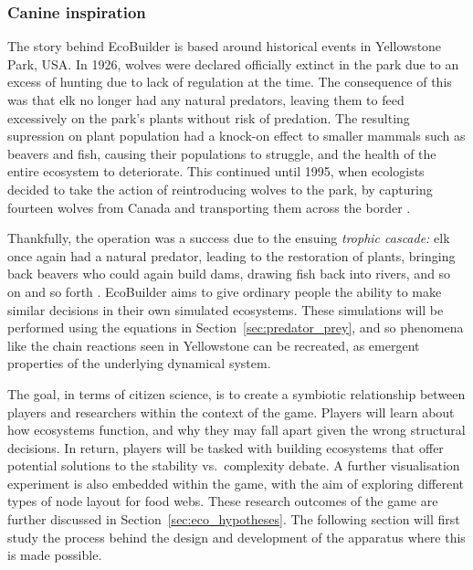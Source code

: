 \subsubsection{Canine inspiration}
\label{sec:yellowstone}
The story behind EcoBuilder is based around historical events in Yellowstone Park, USA. In 1926, wolves were declared officially extinct in the park due to an excess of hunting due to lack of regulation at the time. 
The consequence of this was that elk no longer had any natural predators, leaving them to feed excessively on the park's plants without risk of predation. The resulting supression on plant population had a knock-on effect to smaller mammals such as beavers and fish, causing their populations to struggle, and the health of the entire ecosystem to deteriorate.
This continued until 1995, when ecologists decided to take the action of reintroducing wolves to the park, by capturing fourteen wolves from Canada and transporting them across the border \citep{Smith2003}.

Thankfully, the operation was a success due to the ensuing \emph{trophic cascade:} elk once again had a natural predator, leading to the restoration of plants, bringing back beavers who could again build dams, drawing fish back into rivers, and so on and so forth \citep{Dobson2014}.
EcoBuilder aims to give ordinary people the ability to make similar decisions in their own simulated ecosystems. These simulations will be performed using the equations in Section~\ref{sec:predator_prey}, and so phenomena like the chain reactions seen in Yellowstone can be recreated, as emergent properties of the underlying dynamical system.

The goal, in terms of citizen science, is to create a symbiotic relationship between players and researchers within the context of the game.
Players will learn about how ecosystems function, and why they may fall apart given the wrong structural decisions. In return, players will be tasked with building ecosystems that offer potential solutions to the stability vs.\ complexity debate. A further visualisation experiment is also embedded within the game, with the aim of exploring different types of node layout for food webs. These research outcomes of the game are further discussed in Section~\ref{sec:eco_hypotheses}.
The following section will first study the process behind the design and development of the apparatus where this is made possible.

